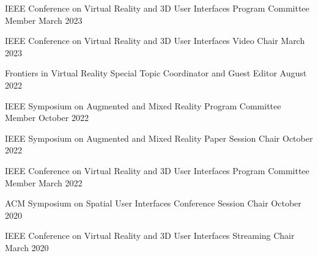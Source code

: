 
\begin{cventries}
  
  \cventry
    {IEEE Conference on Virtual Reality and 3D User Interfaces} %
    {Program Committee Member} %
    {March 2023} %
    {} %
    {}
    \vspace{-0.15in}
  
  \cventry
    {IEEE Conference on Virtual Reality and 3D User Interfaces} %
    {Video Chair} %
    {March 2023} %
    {} %
    {}
    \vspace{-0.15in}

  \cventry
    {Frontiers in Virtual Reality} %
    {Special Topic Coordinator and Guest Editor} %
    {August 2022} %
    {} %
    {}
    \vspace{-0.15in}

  \cventry
    {IEEE Symposium on Augmented and Mixed Reality} %
    {Program Committee Member} %
    {October 2022} %
    {} %
    {}
    \vspace{-0.15in}

  \cventry
    {IEEE Symposium on Augmented and Mixed Reality} %
    {Paper Session Chair} %
    {October 2022} %
    {} %
    {}
    \vspace{-0.15in}
  
  \cventry
    {IEEE Conference on Virtual Reality and 3D User Interfaces} %
    {Program Committee Member} %
    {March 2022} %
    {} %
    {}
    \vspace{-0.15in}
    
  \cventry
    {ACM Symposium on Spatial User Interfaces} %
    {Conference Session Chair} %
    {October 2020} %
    {} %
    {}
    \vspace{-0.15in}

  \cventry
    {IEEE Conference on Virtual Reality and 3D User Interfaces} %
    {Streaming Chair} %
    {March 2020} %
    {} %
    {}
    \vspace{-0.15in}


\end{cventries}
